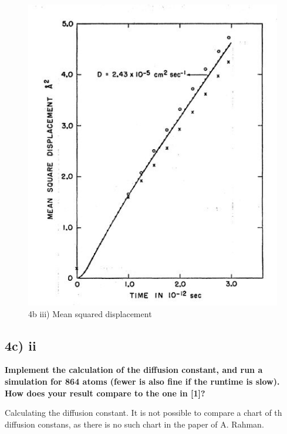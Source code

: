 \documentclass[a4paper,10pt,english]{article}
\begin{document}
\begin{figure}[h!]
        \centering 
        \includegraphics[scale=0.6]{./py/3Rahman.jpg} 
        \caption{4b iii) Mean squared displacement }
        \label{fig:4bv}
\end{figure}

\newpage
\subsection{4c) ii}
\textbf{Implement the calculation of the diffusion constant, and run a simulation for 864 atoms (fewer
is also fine if the runtime is slow). How does your result compare to the one in [1]?
}

Calculating the diffusion constant. It is not possible to compare a chart of th diffusion constans, as there is no such chart in the paper of A. Rahman. 
\end{document}
